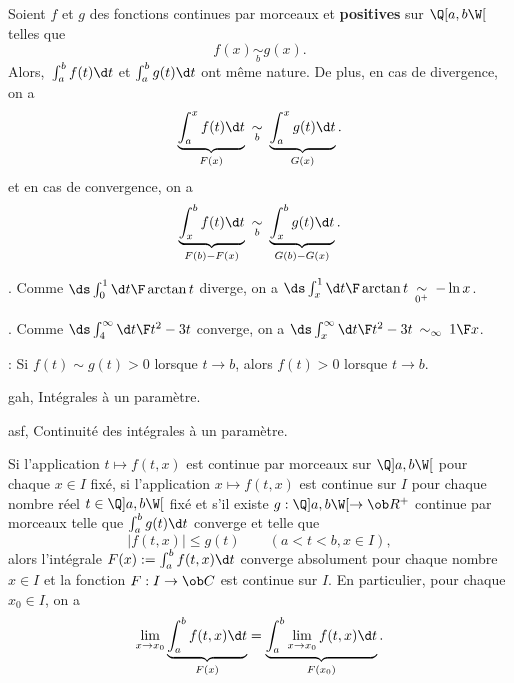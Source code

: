 \Theoreme [$a\in\ob R$ et $b>a$ un \'el\'ement de $\ol R$] 
Soient $f$ et $g$ des fonctions continues par morceaux et {\bf positives} sur $\Q[a,b\W[$ telles que 
$$
f(x)\mathop{\sim}\limits_bg(x).
$$ 
Alors,~$\int_a^bf(t)\d t$ et $\int_a^bg(t)\d t$ ont m\^eme nature. 
De plus, en cas de divergence, on a 
$$
\underbrace{\int_a^xf(t)\d t}_{F(x)}\ \mathop{\sim}_b\ \underbrace{\int_a^xg(t)\d t}_{G(x)}. 
$$
et en cas de convergence, on a 
$$
\underbrace{\int_x^bf(t)\d t}_{F(b)-F(x)}\ \mathop{\sim}_b\ \underbrace{\int_x^bg(t)\d t}_{G(b)-G(x)}.
$$

\Exemple. Comme $\ds \int_0^1{\d t\F\arctan t}$ diverge, on a $\ds \int_x^1{\d t\F\arctan t}\ \mathop{\sim}\limits_{0^+}\ -\ln x$. 
\bigskip

\Exemple. Comme $\ds \int_4^\infty{\d t\F t^2-3t}$ converge, on a $\ds\int_x^\infty{\d t\F t^2-3t}\ \mathop{\sim}_{\infty}\ {1\F x}$. 
\bigskip

\Remarque : Si $f(t)\sim g(t)>0$ lorsque $t\to b$, alors $f(t)>0$ lorsque $t\to b$. 
\bigskip

\Section gah, Int\'egrales \`a un param\`etre. 
\bigskip


\Subsection asf, Continuit\'e des int\'egrales \`a un param\`etre. 

\Theoreme [Index=Theoreme@Th\'eor\`eme!de continuite@de continuit\'e des int\'egrales \`a un param\`etre;Title=Th\'eor\`eme de continuit\'e des int\'egrales {\it g\'en\'eralis\'ees}\`a un param\`etre;$a<b$ dans $\ol{\ob R}$, $I$ intervalle, $f:(t,x)\mapsto f(t,x)$ application] 
Si l'application $t\mapsto f(t,x)$ est continue par morceaux sur $\Q]a,b\W[$ pour chaque $x\in I$ fix\'e, \pn
si l'application $x\mapsto f(t,x)$ est continue sur $I$ pour chaque nombre r\'eel $t\in\Q]a,b\W[$ fix\'e et \pn
s'il existe $g:\Q]a,b\W[\to\ob R^+$ continue par morceaux telle que $\int_a^bg(t)\d t$ converge et telle que 
$$
\big|f(t,x)\big|\le g(t)\qquad(a<t<b, x\in I), 
$$
alors l'int\'egrale $F(x):=\int_a^bf(t,x)\d t$ converge absolument pour chaque nombre $x\in I$ et 
la fonction $F:I\to\ob C$ est continue sur $I$. En particulier, pour chaque $x_0\in I$, on a 
$$
\lim_{x\to x_0}\underbrace{\int_a^bf(t,x)\d t}_{F(x)}=\underbrace{\int_a^b\lim_{x\to x_0}f(t,x)\d t}_{F(x_0)}. 
$$

%
%

